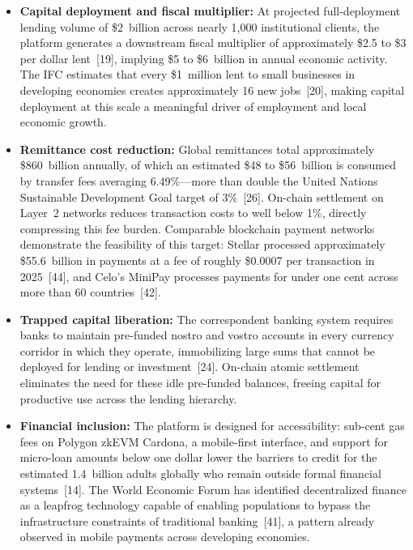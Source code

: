\documentclass[12pt,a4paper]{report}
\begin{document}
\begin{itemize}[noitemsep]
\item \textbf{Capital deployment and fiscal multiplier:} At projected full-deployment lending volume of \$2~billion across nearly 1,000 institutional clients, the platform generates a downstream fiscal multiplier of approximately \$2.5 to \$3 per dollar lent~[19], implying \$5 to \$6~billion in annual economic activity. The IFC estimates that every \$1~million lent to small businesses in developing economies creates approximately 16 new jobs~[20], making capital deployment at this scale a meaningful driver of employment and local economic growth.

\item \textbf{Remittance cost reduction:} Global remittances total approximately \$860~billion annually, of which an estimated \$48 to \$56~billion is consumed by transfer fees averaging 6.49\%---more than double the United Nations Sustainable Development Goal target of 3\%~[26]. On-chain settlement on Layer~2 networks reduces transaction costs to well below 1\%, directly compressing this fee burden. Comparable blockchain payment networks demonstrate the feasibility of this target: Stellar processed approximately \$55.6~billion in payments at a fee of roughly \$0.0007 per transaction in 2025~[44], and Celo's MiniPay processes payments for under one cent across more than 60 countries~[42].

\item \textbf{Trapped capital liberation:} The correspondent banking system requires banks to maintain pre-funded nostro and vostro accounts in every currency corridor in which they operate, immobilizing large sums that cannot be deployed for lending or investment~[24]. On-chain atomic settlement eliminates the need for these idle pre-funded balances, freeing capital for productive use across the lending hierarchy.

\item \textbf{Financial inclusion:} The platform is designed for accessibility: sub-cent gas fees on Polygon zkEVM Cardona, a mobile-first interface, and support for micro-loan amounts below one dollar lower the barriers to credit for the estimated 1.4~billion adults globally who remain outside formal financial systems~[14]. The World Economic Forum has identified decentralized finance as a leapfrog technology capable of enabling populations to bypass the infrastructure constraints of traditional banking~[41], a pattern already observed in mobile payments across developing economies.


\end{itemize}
\end{document}

